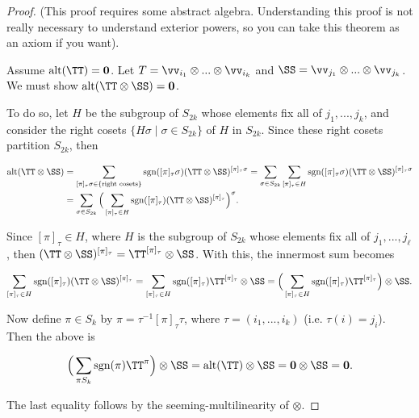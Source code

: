 \begin{proof}
    \newcommand{\pit}{[\pi]_\tau}

    (This proof requires some abstract algebra. Understanding this proof is not really necessary to understand exterior powers, so you can take this theorem as an axiom if you want).

    Assume $\alt(\TT) = \mathbf{0}$. Let $T = \vv_{i_1} \otimes ... \otimes \vv_{i_{k}}$ and $\SS = \vv_{j_1} \otimes ... \otimes \vv_{j_k}$. We must show $\alt(\TT \otimes \SS) = \mathbf{0}$. 
    
    To do so, let $H$ be the subgroup of $S_{2k}$ whose elements fix all of $j_1, ..., j_k$, and consider the right cosets $\{H \sigma \mid \sigma \in S_{2k}\}$ of $H$ in $S_{2k}$. Since these right cosets partition $S_{2k}$, then
    
    \begin{align*}
        \alt(\TT \otimes \SS) &= \sum_{\pit \sigma \in \{\text{right cosets}\}} \text{sgn}({\pit \sigma}) (\TT \otimes \SS)^{\pit \sigma} = \sum_{\sigma \in S_{2k}} \sum_{\pit \in H} \text{sgn}({\pit \sigma}) (\TT \otimes \SS)^{\pit \sigma} \\
        &= \sum_{\sigma \in S_{2k}} \Big(\sum_{\pit \in H} \text{sgn}({\pit}) (\TT \otimes \SS)^{\pit} \Big)^{\sigma}.
    \end{align*}
    
    Since $\pit \in H$, where $H$ is the subgroup of $S_{2k}$ whose elements fix all of $j_1, ..., j_{\ell}$, then $(\TT \otimes \SS)^{\pit} = \TT^{\pit} \otimes \SS$. With this, the innermost sum becomes
    
    \begin{align*}
        \sum_{\pit \in H} \text{sgn}({\pit}) (\TT \otimes \SS)^{\pit} 
        = \sum_{\pit \in H} \text{\sgn}({\pit}) \TT^{\pit} \otimes \SS
        = \Big(\sum_{\pit \in H} \text{sgn}({\pit}) \TT^{\pit}\Big) \otimes \SS.
    \end{align*}
    
    Now define $\pi \in S_{k}$ by $\pi = \tau^{-1} \pit \tau$, where $\tau = (i_1, ..., i_{k})$ (i.e. $\tau(i) = j_i$). Then the above is
    
    \begin{align*}
        \Big(\sum_{\pi S_{k}} \text{sgn}({\pi}) \TT^{\pi}\Big) \otimes \SS 
        = \alt(\TT) \otimes \SS 
        = \mathbf{0} \otimes \SS
        = \mathbf{0}.
    \end{align*}
    
    The last equality follows by the seeming-multilinearity of $\otimes$. 
\end{proof}


